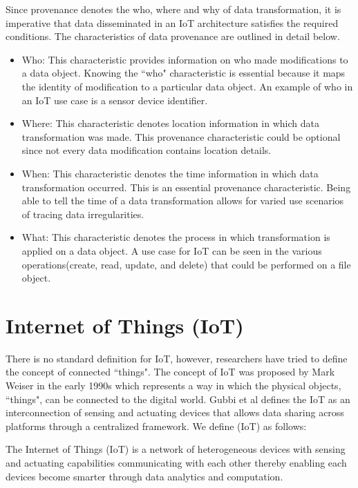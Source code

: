 Since provenance denotes the who, where and why of data transformation, it is imperative that data disseminated in an IoT architecture satisfies the required conditions. The characteristics of data provenance are outlined in detail below.


\begin{itemize}

\item Who: This characteristic provides information on who made modifications to a data object. Knowing the ``who" characteristic is essential because it maps the identity of modification to a particular data object. An example of who in an IoT use case is a sensor device identifier.

\item Where: This characteristic denotes location information in which data transformation was made. This provenance characteristic could be optional since not every data modification contains location details.

\item When: This characteristic denotes the time information in which data transformation occurred. This is an essential provenance characteristic. Being able to tell the time of a data transformation allows for varied use scenarios of tracing data irregularities.

\item What: This characteristic denotes the process in which transformation is applied on a data object. A use case for IoT can be seen in the various operations(create, read, update, and delete) that could be performed on a file object.

\end{itemize}


 
\section{Internet of Things (IoT)}
There is no standard definition for IoT, however, researchers have tried to define the concept of connected ``things". The concept of IoT was proposed by Mark Weiser in the early 1990s\cite{Mattern} which represents a way in which the physical objects, ``things", can be connected to the digital world. Gubbi et al \cite{park_provenance-based_2012} defines the IoT as  an interconnection of sensing and actuating devices that allows data sharing across platforms through a centralized framework. We define (IoT) as follows:

\begin{definition}
The Internet of Things (IoT) is a network of heterogeneous devices with sensing and actuating capabilities communicating with each other thereby enabling each devices become smarter through data analytics and computation. 

\end{definition}

